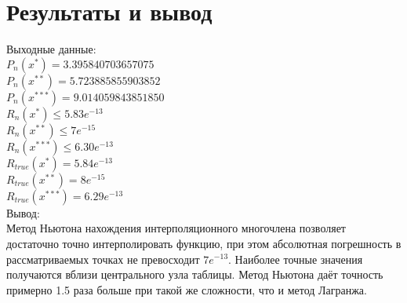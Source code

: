 \documentclass[10pt]{scrartcl}
\begin{document}
\section*{Результаты и вывод}\noindent
Выходные данные:\\
$P_n(x^*) = 3.395840703657075$\\
$P_n(x^{**}) = 5.723885855903852$\\
$P_n(x^{***})= 9.014059843851850$\\
$R_n(x^*) \leq 5.83e^{-13}$\\
$R_n(x^{**}) \leq 7e^{-15}$\\
$R_n(x^{***}) \leq 6.30e^{-13}$\\
$R_{true}(x^*) = 5.84e^{-13}$\\
$R_{true}(x^{**}) = 8e^{-15}$\\
$R_{true}(x^{***}) = 6.29e^{-13}$\\
Вывод:\\
Метод Ньютона нахождения интерполяционного многочлена позволяет достаточно точно интерполировать
функцию, при этом абсолютная погрешность в рассматриваемых точках не превосходит $7e^{-13}$. Наиболее 
точные значения получаются вблизи центрального узла таблицы. Метод Ньютона даёт точность
примерно 1.5 раза больше при такой же сложности, что и метод Лагранжа.
\end{document}
